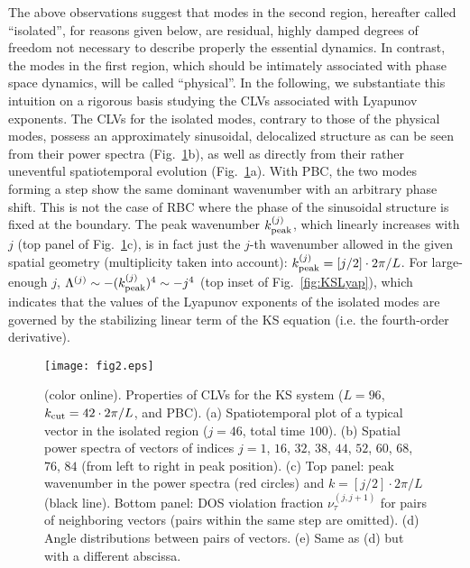 \documentclass[prl,twocolumn,twoside,showpacs,superscriptaddress]{revtex4}
\begin{document}
The above observations suggest that modes in the second region, hereafter called ``isolated'',
for reasons given below, are residual,
highly damped degrees of freedom not necessary to describe properly 
the essential dynamics. In contrast, the modes in the first region, which should be intimately
associated with phase space dynamics, will be called ``physical''. 
In the following, we substantiate this intuition on a rigorous basis
studying the CLVs associated with Lyapunov exponents.  
%
%
The CLVs for the isolated modes, contrary to those
of the physical modes,
possess an approximately sinusoidal, delocalized structure
 as can be seen from their power spectra (Fig.\ \ref{fig:KSVarious}b),
 as well as directly
 from their rather uneventful 
spatiotemporal evolution (Fig.\ \ref{fig:KSVarious}a).
With PBC, the two modes forming a step show the same dominant wavenumber
 with an arbitrary phase shift.
This is not the case of RBC
 where the phase of the sinusoidal structure is fixed at the boundary.
The peak wavenumber $k_{\rm peak}^{(j)}$, which
 linearly increases with $j$ (top panel of Fig.\ \ref{fig:KSVarious}c),
is in fact just the $j$-th wavenumber
 allowed in the given spatial geometry  (multiplicity taken into account):
 $k_{\rm peak}^{(j)} = [j/2] \cdot 2\pi/L$.
For large-enough $j$, 
$\Lambda^{(j)} \sim -(k_{\rm peak}^{(j)})^4 \sim -j^4$ 
(top inset of Fig.~\ref{fig:KSLyap}),
which indicates that the values of the Lyapunov exponents
 of the isolated modes are governed
 by the stabilizing linear term of the KS equation
(i.e. the fourth-order derivative).

\begin{figure}[t]
 \begin{center}
  \texttt{[image: fig2.eps]}
  \caption{(color online). 
Properties of CLVs for the KS system
($L = 96$, $k_{\rm cut} = 42 \cdot 2\pi/L$, and PBC). 
(a) Spatiotemporal plot of a typical vector in the isolated region
($j=46$, total time $100$). 
(b) Spatial power spectra of vectors of indices $j = 1$, $16$, $32$, $38$, $44$, $52$, $60$, $68$, $76$, $84$ (from left to right in peak position). 
(c) Top panel: peak wavenumber in the power spectra (red circles) 
and $k = [j/2] \cdot 2\pi/L$ (black line). 
Bottom panel: DOS violation fraction $\nu^{(j,j+1)}_\tau$ for pairs of 
neighboring vectors (pairs within the same step are omitted). 
(d) Angle distributions between pairs of vectors.
(e) Same as (d) but with a different abscissa.}
  \label{fig:KSVarious}
 \end{center}
\end{figure}%
\end{document}
